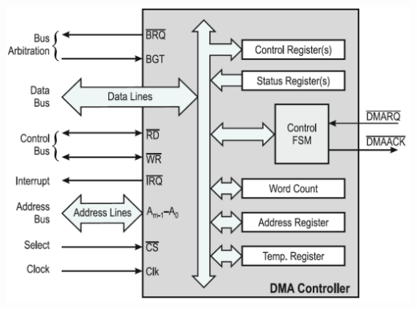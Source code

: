 \begin{minipage}{0.2\linewidth}
    \includegraphics[width=1.5\linewidth]{images/DMAController}
\end{minipage}
    
\clearpage
\pagebreak